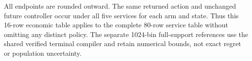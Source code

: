 \noindent All endpoints are rounded outward. The same returned action and unchanged future controller occur under all five services for each arm and state. Thus this 16-row economic table applies to the complete 80-row service table without omitting any distinct policy. The separate 1024-bin full-support references use the shared verified terminal compiler and retain numerical bounds, not exact regret or population uncertainty.
\endgroup
